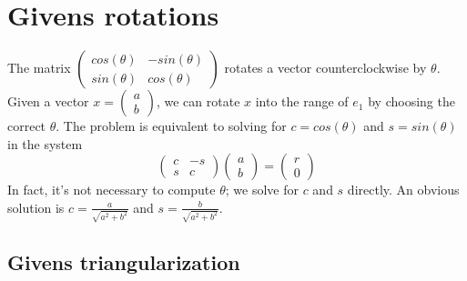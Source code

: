 \section*{Givens rotations}

The matrix $\begin{pmatrix} cos(\theta) & -sin(\theta) \\ sin(\theta) & cos(\theta) \end{pmatrix}$ rotates a vector counterclockwise by $\theta$. Given a vector $x = \begin{pmatrix} a \\ b \end{pmatrix}$, we can rotate $x$ into the range of $e_1$ by choosing the correct $\theta$. The problem is equivalent to solving for $c = cos(\theta)$ and $s = sin(\theta)$ in the system
\begin{equation}
\label{eq:Givens rotation system}
\begin{pmatrix} c & -s \\ s & c \end{pmatrix} \begin{pmatrix}a\\b\end{pmatrix} 
= \begin{pmatrix}r\\0\end{pmatrix}
\end{equation}
 In fact, it's not necessary to compute $\theta$; we solve for $c$ and $s$ directly. An obvious solution is $c = \frac{a}{\sqrt{a^2 + b^2}}$ and $s = \frac{b}{\sqrt{a^2+b^2}}$.

\subsection*{Givens triangularization}

